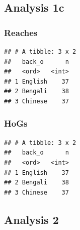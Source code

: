 \documentclass[]{article}
\newenvironment{Shaded}{\begin{snugshade}}{\end{snugshade}}
\newcommand{\DataTypeTok}[1]{\textcolor[rgb]{0.13,0.29,0.53}{#1}}
\newcommand{\KeywordTok}[1]{\textcolor[rgb]{0.13,0.29,0.53}{\textbf{#1}}}
\newcommand{\NormalTok}[1]{#1}
\newcommand{\OperatorTok}[1]{\textcolor[rgb]{0.81,0.36,0.00}{\textbf{#1}}}
\newcommand{\StringTok}[1]{\textcolor[rgb]{0.31,0.60,0.02}{#1}}
\begin{document}
\hypertarget{analysis-1c-1}{%
\subsection{Analysis 1c}\label{analysis-1c-1}}

\hypertarget{reaches-4}{%
\subsubsection{Reaches}\label{reaches-4}}

\begin{Shaded}
\end{Shaded}

\begin{verbatim}
## # A tibble: 3 x 2
##   back_o      n
##   <ord>   <int>
## 1 English    37
## 2 Bengali    38
## 3 Chinese    37
\end{verbatim}

\hypertarget{hogs-2}{%
\subsubsection{HoGs}\label{hogs-2}}

\begin{Shaded}
\end{Shaded}

\begin{verbatim}
## # A tibble: 3 x 2
##   back_o      n
##   <ord>   <int>
## 1 English    37
## 2 Bengali    38
## 3 Chinese    37
\end{verbatim}

\hypertarget{analysis-2}{%
\subsection{Analysis 2}\label{analysis-2}}
\end{document}
